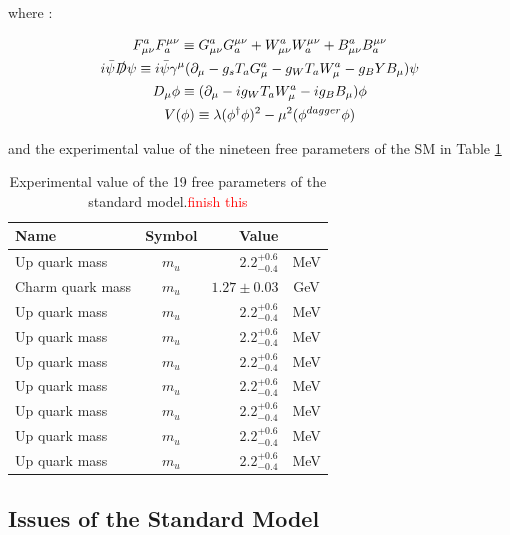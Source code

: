 where :

\begin{multline*}
    F_{\mu\nu}^a F^{\mu\nu}_a \equiv G_{\mu\nu}^a G^{\mu\nu}_a + W_{\mu\nu}^a W^{\mu\nu}_a + B_{\mu\nu}^a B^{\mu\nu}_a \\
    i\Bar{\psi}\slashed{D}\psi \equiv i\Bar{\psi}\gamma^{\mu} (\partial_{\mu} - g_s T_a G_{\mu}^a - g_W T_a W^{a}_{\mu} - g_B Y B_{\mu})  \psi \\
    D_{\mu}\phi \equiv (\partial_{\mu} - ig_W T_a W_{\mu}^{a} - ig_B B_{\mu})\phi \\
    V(\phi) \equiv \lambda(\phi^{\dagger}\phi)^2 - \mu^2 (\phi^{dagger}\phi)
\end{multline*}

and the experimental value of the nineteen free parameters of the SM in Table \ref{tab:SMparams}

\begin{table}[]
    \centering
    \begin{tabular}{l c r c}
        \hline
        \textbf{Name} & \textbf{Symbol} & \textbf{Value} & \\
        \hline
        Up quark mass & $m_u$ & $2.2^{+0.6}_{-0.4}$ & MeV \\
        Charm quark mass & $m_u$ & $1.27 \pm 0.03$ & GeV \\
        Up quark mass & $m_u$ & $2.2^{+0.6}_{-0.4}$ & MeV \\
        Up quark mass & $m_u$ & $2.2^{+0.6}_{-0.4}$ & MeV \\
        Up quark mass & $m_u$ & $2.2^{+0.6}_{-0.4}$ & MeV \\
        Up quark mass & $m_u$ & $2.2^{+0.6}_{-0.4}$ & MeV \\
        Up quark mass & $m_u$ & $2.2^{+0.6}_{-0.4}$ & MeV \\
        Up quark mass & $m_u$ & $2.2^{+0.6}_{-0.4}$ & MeV \\
        Up quark mass & $m_u$ & $2.2^{+0.6}_{-0.4}$ & MeV \\
        
    \end{tabular}
    \caption{Experimental value of the 19 free parameters of the standard model.\textcolor{red}{finish this}}
    \label{tab:SMparams}
\end{table}

\subsection{Issues of the Standard Model}
\label{sec:SM_limits}

